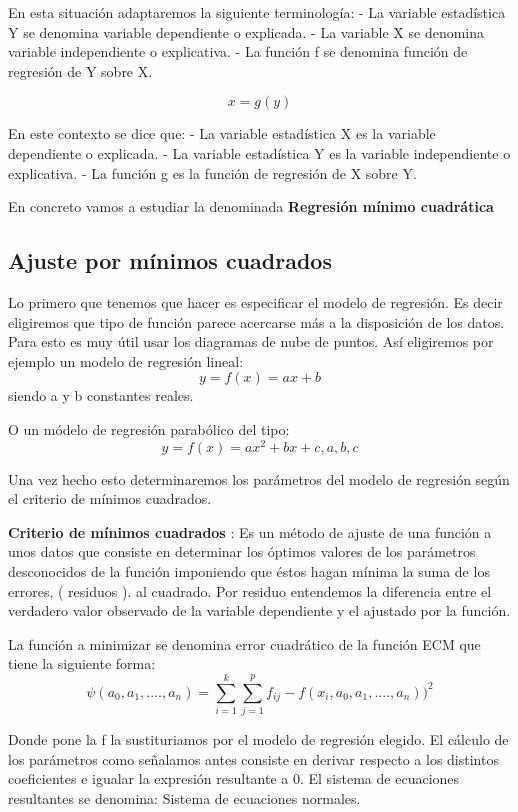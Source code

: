 \documentclass{article}
\begin{document}
	En esta situación adaptaremos la siguiente terminología:
		- La variable estadística Y se denomina variable dependiente o explicada.
		- La variable X se denomina variable independiente o explicativa.
		- La función f se denomina función de regresión de Y sobre X.
		
	$$ x = g(y) $$
	
	En este contexto se dice que:
		- La variable estadística X es la variable dependiente o explicada.
		- La variable estadística Y es la variable independiente o explicativa.
		- La función g es la función de regresión de X sobre Y.
		
	En concreto vamos a estudiar la denominada \textbf{Regresión mínimo cuadrática} 
	
	\subsection{Ajuste por mínimos cuadrados}
	
	Lo primero que tenemos que hacer es especificar el modelo de regresión. Es decir eligiremos que tipo de función parece acercarse más a la disposición de los datos. Para esto es muy útil usar los diagramas de nube de puntos. Así eligiremos por ejemplo un modelo de regresión lineal: $$ y = f(x) = ax + b $$ siendo a y b constantes reales.
	
	O un módelo de regresión parabólico del tipo:
	$$ y = f(x) = ax^2 +bx + c, a,b,c $$
	
	Una vez hecho esto determinaremos los parámetros del modelo de regresión según el criterio de mínimos cuadrados.
	\vspace{2mm}
	
	
	\textbf{Criterio de mínimos cuadrados} : Es un método de ajuste de una función a unos datos que consiste en determinar los óptimos valores de los parámetros desconocidos de la función imponiendo que éstos hagan mínima la suma de los errores, ( residuos ). al cuadrado. Por residuo entendemos la diferencia entre el verdadero valor observado de la variable dependiente y el ajustado por la función.
	\vspace{2mm}
	
	 La función a minimizar se denomina error cuadrático de la función ECM que tiene la siguiente forma:
	 $$\psi (a_0,a_1,....,a_n) = \sum_{i=1}^k \sum_{j=1}^p f_{ij} - f(x_i,a_0,a_1,....,a_n))^2 $$
	
	 Donde pone la f la sustituriamos por el modelo de regresión elegido. El cálculo de los parámetros como señalamos antes consiste en derivar respecto a los distintos coeficientes e igualar la expresión resultante a 0. El sistema de ecuaciones resultantes se denomina: Sistema de ecuaciones normales.
	\vspace{2mm}
	
\end{document}
